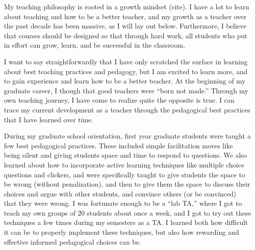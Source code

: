 \documentclass[11pt]{article}
\begin{document}
\thispagestyle{fancy}

My teaching philosophy is rooted in a growth mindset (cite). 
I have a lot to learn about teaching and how to be a better teacher, and my growth as a teacher over the past decade has been massive, as I will lay out below. 
Furthermore, I believe that courses should be designed so that through hard work, all students who put in effort can grow, learn, and be successful in the classroom.

I want to say straightforwardly that I have only scratched the surface in learning about best teaching practices and pedagogy, but I am excited to learn more, and to gain experience and learn how to be a better teacher. 
At the beginning of my graduate career, I though that good teachers were “born not made.” Through my own teaching journey, I have come to realize quite the opposite is true. 
I can trace my current development as a teacher through the pedagogical best practices that I have learned over time.

During my graduate school orientation, first year graduate students were taught a few best pedagogical practices. 
These included  simple facilitation moves like being silent and giving students space and time to respond to questions. 
We also learned about how to  incorporate active learning techniques like multiple choice questions and clickers, and were specifically taught to give students the space to be wrong (without penalization), and then to give them the space to discuss their choices and argue with other students, and convince others (or be convinced) that they were wrong. 
I was fortunate enough to be a “lab TA,” where I got to teach my own groups of 20 students about once a week, and I got to try out these techniques a few times during my semesters as a TA. 
I learned both how difficult it can be to properly implement these techniques, but also how rewarding and effective informed pedagogical choices can be.
\end{document}
